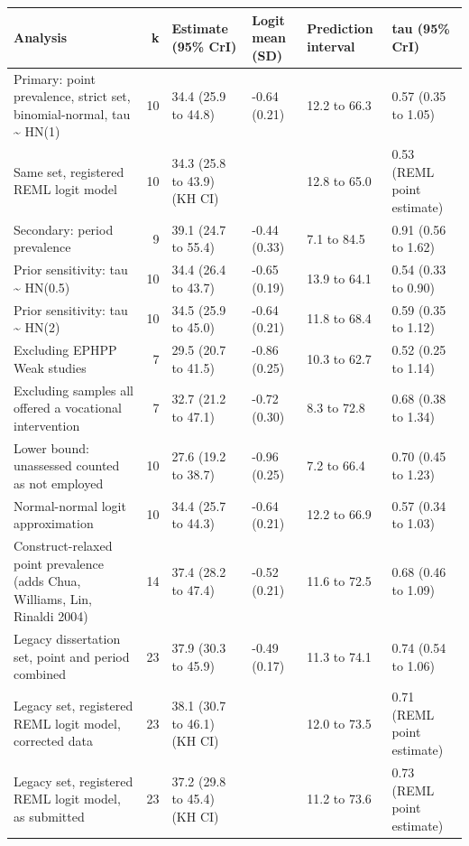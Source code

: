 
\begin{tabular}{lrllll}
\toprule
Analysis & k & Estimate (95\% CrI) & Logit mean (SD) & Prediction interval & tau (95\% CrI)\\
\midrule
Primary: point prevalence, strict set, binomial-normal, tau \textasciitilde{} HN(1) & 10 & 34.4 (25.9 to 44.8) & -0.64 (0.21) & 12.2 to 66.3 & 0.57 (0.35 to 1.05)\\
Same set, registered REML logit model & 10 & 34.3 (25.8 to 43.9) (KH CI) &  & 12.8 to 65.0 & 0.53 (REML point estimate)\\
Secondary: period prevalence & 9 & 39.1 (24.7 to 55.4) & -0.44 (0.33) & 7.1 to 84.5 & 0.91 (0.56 to 1.62)\\
Prior sensitivity: tau \textasciitilde{} HN(0.5) & 10 & 34.4 (26.4 to 43.7) & -0.65 (0.19) & 13.9 to 64.1 & 0.54 (0.33 to 0.90)\\
Prior sensitivity: tau \textasciitilde{} HN(2) & 10 & 34.5 (25.9 to 45.0) & -0.64 (0.21) & 11.8 to 68.4 & 0.59 (0.35 to 1.12)\\
Excluding EPHPP Weak studies & 7 & 29.5 (20.7 to 41.5) & -0.86 (0.25) & 10.3 to 62.7 & 0.52 (0.25 to 1.14)\\
Excluding samples all offered a vocational intervention & 7 & 32.7 (21.2 to 47.1) & -0.72 (0.30) & 8.3 to 72.8 & 0.68 (0.38 to 1.34)\\
Lower bound: unassessed counted as not employed & 10 & 27.6 (19.2 to 38.7) & -0.96 (0.25) & 7.2 to 66.4 & 0.70 (0.45 to 1.23)\\
Normal-normal logit approximation & 10 & 34.4 (25.7 to 44.3) & -0.64 (0.21) & 12.2 to 66.9 & 0.57 (0.34 to 1.03)\\
Construct-relaxed point prevalence (adds Chua, Williams, Lin, Rinaldi 2004) & 14 & 37.4 (28.2 to 47.4) & -0.52 (0.21) & 11.6 to 72.5 & 0.68 (0.46 to 1.09)\\
Legacy dissertation set, point and period combined & 23 & 37.9 (30.3 to 45.9) & -0.49 (0.17) & 11.3 to 74.1 & 0.74 (0.54 to 1.06)\\
Legacy set, registered REML logit model, corrected data & 23 & 38.1 (30.7 to 46.1) (KH CI) &  & 12.0 to 73.5 & 0.71 (REML point estimate)\\
Legacy set, registered REML logit model, as submitted & 23 & 37.2 (29.8 to 45.4) (KH CI) &  & 11.2 to 73.6 & 0.73 (REML point estimate)\\
\bottomrule
\end{tabular}
